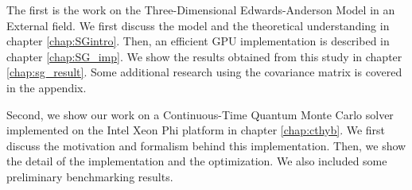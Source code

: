 The first is the work on the Three-Dimensional Edwards-Anderson Model in an External
field. We first discuss the model and the theoretical understanding in chapter 
\ref{chap:SGintro}. Then, an efficient GPU implementation is described in chapter
\ref{chap:SG_imp}. We show the results obtained from this study in chapter \ref{chap:sg_result}.
Some additional research using the covariance matrix is covered in the appendix.

Second, we show our work on a Continuous-Time Quantum Monte Carlo solver implemented
on the Intel Xeon Phi platform in chapter \ref{chap:cthyb}. We first discuss the 
motivation and formalism behind this implementation. Then, we show the detail of
the implementation and the optimization. We also included some preliminary benchmarking
results.




